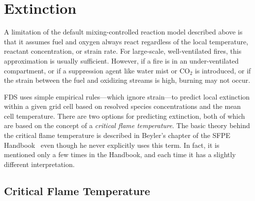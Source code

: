 \clearpage

\section{Extinction}
\label{extinction}

A limitation of the default mixing-controlled reaction model described above is that it assumes fuel and oxygen always react regardless of the local temperature, reactant concentration, or strain rate. For large-scale, well-ventilated fires, this approximation is usually sufficient. However, if a fire is in an under-ventilated compartment, or if a suppression agent like water mist or CO$_2$ is introduced, or if the strain between the fuel and oxidizing streams is high, burning may not occur.

FDS uses simple empirical rules---which ignore strain---to predict local extinction within a given grid cell based on resolved species concentrations and the mean cell temperature. There are two options for predicting extinction, both of which are based on the concept of a \emph{critical flame temperature}. The basic theory behind the critical flame temperature is described in Beyler's chapter of the SFPE Handbook~\cite{SFPE:Beyler} even though he never explicitly uses this term. In fact, it is mentioned only a few times in the Handbook, and each time it has a slightly different interpretation.


\subsection{Critical Flame Temperature}
\label{CFT}

